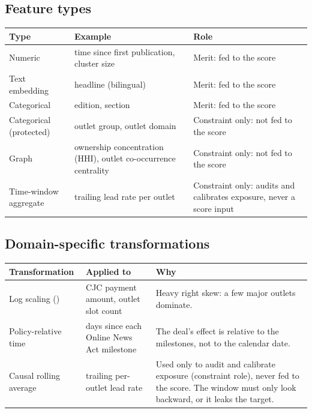 \documentclass[11pt,letterpaper]{article}
\newcommand{\code}[1]{\texttt{\detokenize{#1}}}
\begin{document}
\subsection*{Feature types}
{\small
\begin{tabularx}{\textwidth}{@{}L{0.2\textwidth} Y L{0.38\textwidth}@{}}
\toprule
\bfseries Type & \bfseries Example & \bfseries Role \\
\midrule
Numeric & time since first publication, cluster size & Merit: fed to the score \\
Text embedding & headline (bilingual) & Merit: fed to the score \\
Categorical & edition, section & Merit: fed to the score \\
Categorical (protected) & outlet group, outlet domain & Constraint only: not fed to the score \\
Graph & ownership concentration (HHI), outlet co-occurrence centrality & Constraint only: not fed to the score \\
Time-window aggregate & trailing lead rate per outlet & Constraint only: audits and calibrates exposure, never a score input \\
\bottomrule
\end{tabularx}
}

\subsection*{Domain-specific transformations}
{\small
\begin{tabularx}{\textwidth}{@{}L{0.2\textwidth} L{0.27\textwidth} Y@{}}
\toprule
\bfseries Transformation & \bfseries Applied to & \bfseries Why \\
\midrule
Log scaling (\code{log1p}) & CJC payment amount, outlet slot count & Heavy right skew: a few major outlets dominate. \\
Policy-relative time & \code{timestamp} \textrightarrow{} days since each Online News Act milestone & The deal's effect is relative to the milestones, not to the calendar date. \\
Causal rolling average & trailing per-outlet lead rate & Used only to audit and calibrate exposure (constraint role), never fed to the score. The window must only look backward, or it leaks the target. \\
\bottomrule
\end{tabularx}
}
\end{document}
